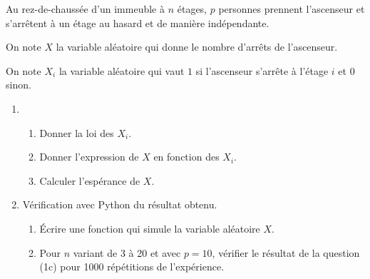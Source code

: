 \begin{exo}
Au rez-de-chaussée d'un immeuble à \(n\) étages, \(p\) personnes prennent l'ascenseur et s'arrêtent à un étage au hasard et de manière indépendante.

On note \(X\) la variable aléatoire qui donne le nombre d'arrêts de l'ascenseur.

On note \(X_i\) la variable aléatoire qui vaut \(1\) si l'ascenseur s'arrête à l'étage \(i\) et \(0\) sinon.

\begin{enumerate}
    \item \begin{enumerate}
        \item Donner la loi des \(X_i\). \\
        \item Donner l'expression de \(X\) en fonction des \(X_i\). \\
        \item Calculer l'espérance de \(X\). \\
    \end{enumerate}
    \item Vérification avec Python du résultat obtenu. \\ \begin{enumerate}
        \item Écrire une fonction qui simule la variable aléatoire \(X\). \\
        \item Pour \(n\) variant de 3 à 20 et avec \(p=10\), vérifier le résultat de la question (1c) pour 1000 répétitions de l'expérience.
    \end{enumerate}
\end{enumerate}
\end{exo}

\begin{corr}
\end{corr}


